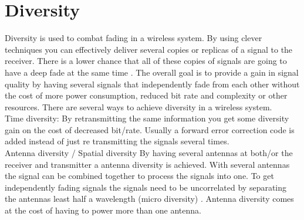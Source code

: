 \section{Diversity}
Diversity is used to combat fading in a wireless system. By using clever techniques you can effectively deliver several copies or replicas of a signal to the receiver. There is a lower chance that all of these copies of signals are going to have a deep fade at the same time \citep[p. 4-6]{diversityFuture}. The overall goal is to provide a gain in signal quality by having several signals that independently fade from each other without the cost of more power consumption, reduced bit rate and complexity or other resources. There are several ways to achieve diversity in a wireless system. \\
Time diversity: By retransmitting the same information you get some diversity gain on the cost of decreased bit/rate. Usually a forward error correction code is added instead of just re transmitting the signals several times. \\
Antenna diversity / Spatial diversity
By having several antennas at both/or the receiver and transmitter a antenna diversity is achieved. With several antennas the signal can be combined together to process the signals into one. To get independently fading signals the signals need to be uncorrelated by separating the antennas least half a wavelength (micro diversity) \citep{diversityAntenna}. Antenna diversity comes at the cost of having to power more than one antenna.



